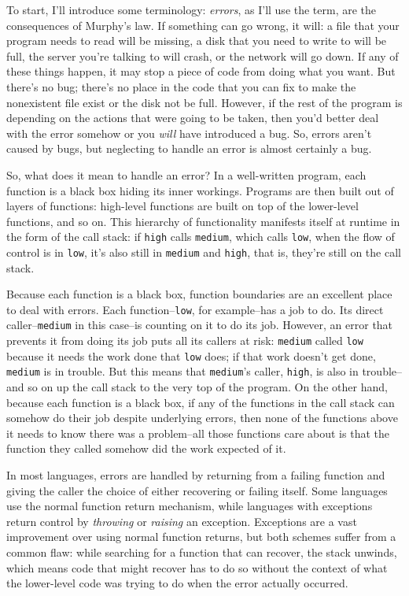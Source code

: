 To start, I'll introduce some terminology: \emph{errors}, as I'll use
the term, are the consequences of Murphy's law. If something can go
wrong, it will: a file that your program needs to read will be missing,
a disk that you need to write to will be full, the server you're talking
to will crash, or the network will go down. If any of these things
happen, it may stop a piece of code from doing what you want. But
there's no bug; there's no place in the code that you can fix to make
the nonexistent file exist or the disk not be full. However, if the rest
of the program is depending on the actions that were going to be taken,
then you'd better deal with the error somehow or you \emph{will} have
introduced a bug. So, errors aren't caused by bugs, but neglecting to
handle an error is almost certainly a bug.

So, what does it mean to handle an error? In a well-written program,
each function is a black box hiding its inner workings. Programs are
then built out of layers of functions: high-level functions are built on
top of the lower-level functions, and so on. This hierarchy of
functionality manifests itself at runtime in the form of the call stack:
if \texttt{high} calls \texttt{medium}, which calls \texttt{low}, when
the flow of control is in \texttt{low}, it's also still in
\texttt{medium} and \texttt{high}, that is, they're still on the call
stack.

Because each function is a black box, function boundaries are an
excellent place to deal with errors. Each function--\texttt{low}, for
example--has a job to do. Its direct caller--\texttt{medium} in this
case--is counting on it to do its job. However, an error that prevents
it from doing its job puts all its callers at risk: \texttt{medium}
called \texttt{low} because it needs the work done that \texttt{low}
does; if that work doesn't get done, \texttt{medium} is in trouble. But
this means that \texttt{medium}'s caller, \texttt{high}, is also in
trouble--and so on up the call stack to the very top of the program. On
the other hand, because each function is a black box, if any of the
functions in the call stack can somehow do their job despite underlying
errors, then none of the functions above it needs to know there was a
problem--all those functions care about is that the function they called
somehow did the work expected of it.

In most languages, errors are handled by returning from a failing
function and giving the caller the choice of either recovering or
failing itself. Some languages use the normal function return mechanism,
while languages with exceptions return control by \emph{throwing} or
\emph{raising} an exception. Exceptions are a vast improvement over
using normal function returns, but both schemes suffer from a common
flaw: while searching for a function that can recover, the stack
unwinds, which means code that might recover has to do so without the
context of what the lower-level code was trying to do when the error
actually occurred.

